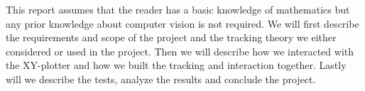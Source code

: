 This report assumes that the reader has a basic knowledge of mathematics but any prior knowledge about computer vision is not required. We will first describe the requirements and scope of the project and the tracking theory we either considered or used in the project. Then we will describe how we interacted with the XY-plotter and how we built the tracking and interaction together. Lastly will we describe the tests, analyze the results and conclude the project.




